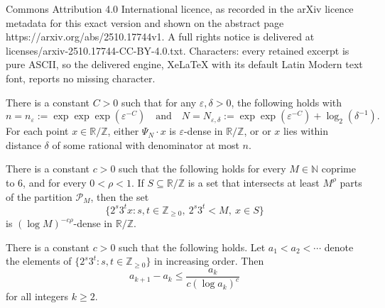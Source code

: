 \documentclass[10pt,a4paper]{amsart}
\newcommand{\R}{{\mathbb R}}
\newcommand{\Z}{{\mathbb Z}}
\begin{document}
Commons Attribution 4.0 International licence, as recorded in the arXiv licence metadata for this exact version and shown on the abstract page https://arxiv.org/abs/2510.17744v1. A full rights notice is delivered at licenses/arxiv-2510.17744-CC-BY-4.0.txt. Characters: every retained excerpt is pure ASCII, so the delivered engine, XeLaTeX with its default Latin Modern text font, reports no missing character.
\begin{theorem}\label{thm:quantitative-furstenberg}
There is a constant $C>0$ such that for any $\varepsilon,\delta>0$, the following holds with
$$n=n_\varepsilon:=\exp\exp\exp(\varepsilon^{-C}) \quad \text{and} \quad N=N_{\varepsilon,\delta}:=\exp\exp(\varepsilon^{-C})+\log_2(\delta^{-1}).$$
For each point $x \in \R/\Z$, either $\Psi_N \cdot x$ is $\varepsilon$-dense in $\R/\Z$, or or $x$ lies within distance $\delta$ of some rational with denominator at most $n$.
\end{theorem}

\begin{theorem}\label{thm:BLMV-entropy}
There is a constant $c>0$ such that the following holds for every $M \in \mathbb{N}$ coprime to $6$, and for every $0<\rho<1$.  If $S \subseteq \mathbb{R}/\mathbb{Z}$ is a set that intersects at least $M^\rho$ parts of the partition $\mathcal{P}_M$, then the set
$$\{2^s 3^t x: s,t \in \mathbb{Z}_{\geq 0},~ 2^s 3^t< M,~ x \in S\}$$
is $(\log M)^{-c\rho}$-dense in $\mathbb{R}/\mathbb{Z}$.
\end{theorem}

\begin{theorem}\label{thm:BLMV-baker}
There is a constant $c>0$ such that the following holds.  Let $a_1<a_2<\cdots$ denote the elements of $\{2^s 3^t: s,t \in \mathbb{Z}_{\geq 0}\}$ in increasing order.  Then
$$a_{k+1}-a_k \leq \frac{a_k}{c (\log a_k)^c}$$
for all integers $k \geq 2$.
\end{theorem}
\end{document}
